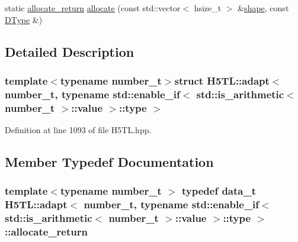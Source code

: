\begin{DoxyCompactItemize}
\item 
static \hyperlink{struct_h5_t_l_1_1adapt_3_01number__t_00_01typename_01std_1_1enable__if_3_01std_1_1is__arithmetic58ffd9dad45132ac3625c2d53f8565f6_a7531d399303876bc9c931a5d4e0afe27}{allocate\-\_\-return} \hyperlink{struct_h5_t_l_1_1adapt_3_01number__t_00_01typename_01std_1_1enable__if_3_01std_1_1is__arithmetic58ffd9dad45132ac3625c2d53f8565f6_a1df38c42bf4530d3cd3ecc23d10b1e79}{allocate} (const std\-::vector$<$ hsize\-\_\-t $>$ \&\hyperlink{struct_h5_t_l_1_1adapt_3_01number__t_00_01typename_01std_1_1enable__if_3_01std_1_1is__arithmetic58ffd9dad45132ac3625c2d53f8565f6_a7e04a05f0fcfe0210b545b870b9cd94f}{shape}, const \hyperlink{class_h5_t_l_1_1_d_type}{D\-Type} \&)
\end{DoxyCompactItemize}


\subsection{Detailed Description}
\subsubsection*{template$<$typename number\-\_\-t$>$struct H5\-T\-L\-::adapt$<$ number\-\_\-t, typename std\-::enable\-\_\-if$<$ std\-::is\-\_\-arithmetic$<$ number\-\_\-t $>$\-::value $>$\-::type $>$}



Definition at line 1093 of file H5\-T\-L.\-hpp.



\subsection{Member Typedef Documentation}
\hypertarget{struct_h5_t_l_1_1adapt_3_01number__t_00_01typename_01std_1_1enable__if_3_01std_1_1is__arithmetic58ffd9dad45132ac3625c2d53f8565f6_a7531d399303876bc9c931a5d4e0afe27}{
\subsubsection[{allocate\-\_\-return}]{\setlength{\rightskip}{0pt plus 5cm}template$<$typename number\-\_\-t $>$ typedef {\bf data\-\_\-t} {\bf H5\-T\-L\-::adapt}$<$ number\-\_\-t, typename std\-::enable\-\_\-if$<$ std\-::is\-\_\-arithmetic$<$ number\-\_\-t $>$\-::value $>$\-::type $>$\-::{\bf allocate\-\_\-return}}}\label{struct_h5_t_l_1_1adapt_3_01number__t_00_01typename_01std_1_1enable__if_3_01std_1_1is__arithmetic58ffd9dad45132ac3625c2d53f8565f6_a7531d399303876bc9c931a5d4e0afe27}


